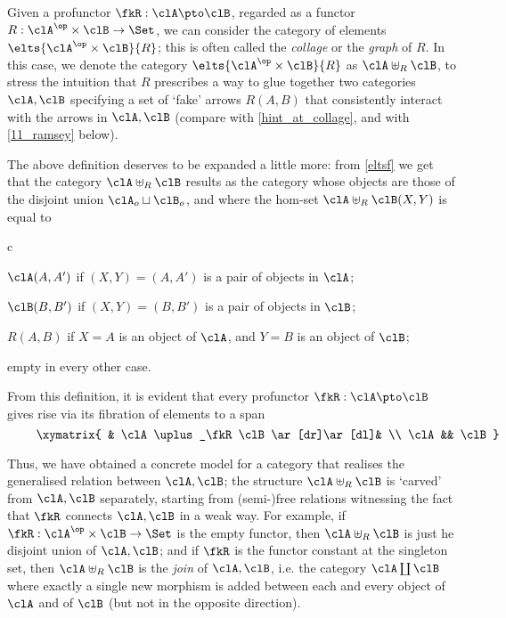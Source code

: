 \begin{corollary}\label{da_collage}
	Given a profunctor $\fkR : \clA \pto \clB$, regarded as a functor $R : \clA^\op\times \clB \to \Set$, we can consider the category of elements $\elts{\clA^\op\times\clB}{R}$; this is often called the \emph{collage} or the \emph{graph} of $R$. In this case, we denote the category $\elts{\clA^\op\times\clB}{R}$ as $\clA\uplus_R\clB$, to stress the intuition that $R$ prescribes a way to glue together two categories $\clA,\clB$ specifying a set of `fake' arrows $R(A,B)$ that consistently interact with the arrows in $\clA,\clB$ (compare with \autoref{hint_at_collage}, and with \autoref{11_ramsey} below).
\end{corollary}
\begin{remark}\label{collage_explaned}
	The above definition deserves to be expanded a little more: from \autoref{eltsf} we get that the category $\clA\uplus_R\clB$ results as the category whose objects are those of the disjoint union $\clA_o\sqcup\clB_o$, and where the hom-set $\clA\uplus_R\clB(X,Y)$ is equal to
	\begin{enumtag}{c}
		\item $\clA(A,A')$ if $(X,Y)=(A,A')$ is a pair of objects in $\clA$;
		\item $\clB(B,B')$ if $(X,Y)=(B,B')$ is a pair of objects in $\clB$;
		\item $R(A,B)$ if $X=A$ is an object of $\clA$, and $Y=B$ is an object of $\clB$;
		\item empty in every other case.
	\end{enumtag}
	From this definition, it is evident that every profunctor $\fkR : \clA \pto \clB$ gives rise via its fibration of elements to a span 
	\[ \vcenter{\xymatrix{
	& \clA\uplus_\fkR \clB \ar[dr]\ar[dl]& \\ 
	\clA  && \clB
}} \]
\end{remark}
Thus, we have obtained a concrete model for a category that realises the generalised relation between $\clA,\clB$; the structure $\clA\uplus_R\clB$ is `carved' from $\clA,\clB$ separately, starting from (semi-)free relations witnessing the fact that $\fkR$ connects $\clA,\clB$ in a weak way. For example, if $\fkR : \clA^\op\times \clB \to \Set$ is the empty functor, then $\clA\uplus_R\clB$ is just he disjoint union of $\clA,\clB$; and if $\fkR$ is the functor constant at the singleton set, then $\clA\uplus_R\clB$ is the \emph{join} of $\clA,\clB$, i.e. the category $\clA\coprod\clB$ where exactly a single new morphism is added between each and every object of $\clA$ and of $\clB$ (but not in the opposite direction).